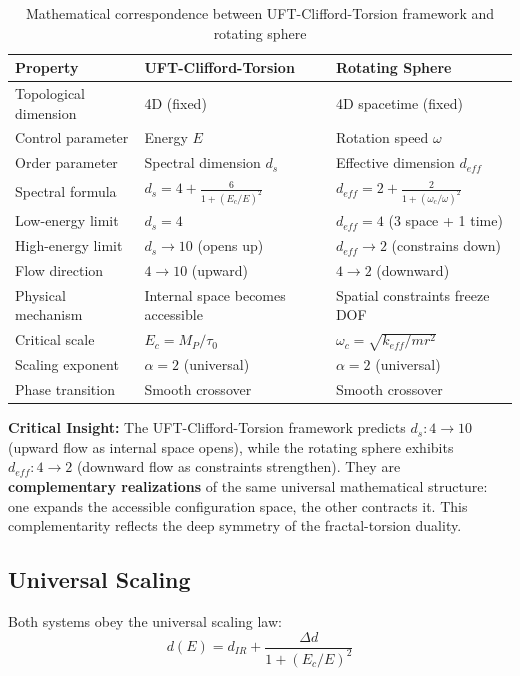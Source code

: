 \documentclass[12pt,a4paper]{article}
\begin{document}
\begin{table}[h]
\centering
\begin{tabular}{p{4cm}p{5cm}p{5cm}}
\toprule
\textbf{Property} & \textbf{UFT-Clifford-Torsion} & \textbf{Rotating Sphere} \\
\midrule
Topological dimension & 4D (fixed) & 4D spacetime (fixed) \\
Control parameter & Energy $E$ & Rotation speed $\omega$ \\
Order parameter & Spectral dimension $d_s$ & Effective dimension $d_{eff}$ \\
Spectral formula & $d_s = 4 + \frac{6}{1+(E_c/E)^2}$ & $d_{eff} = 2 + \frac{2}{1+(\omega_c/\omega)^2}$ \\
Low-energy limit & $d_s = 4$ & $d_{eff} = 4$ (3 space + 1 time) \\
High-energy limit & $d_s \to 10$ (opens up) & $d_{eff} \to 2$ (constrains down) \\
Flow direction & $4 \to 10$ (upward) & $4 \to 2$ (downward) \\
Physical mechanism & Internal space becomes accessible & Spatial constraints freeze DOF \\
Critical scale & $E_c = M_P/\tau_0$ & $\omega_c = \sqrt{k_{eff}/mr^2}$ \\
Scaling exponent & $\alpha = 2$ (universal) & $\alpha = 2$ (universal) \\
Phase transition & Smooth crossover & Smooth crossover \\
\bottomrule
\end{tabular}
\caption{Mathematical correspondence between UFT-Clifford-Torsion framework and rotating sphere}
\label{tab:correspondence}
\end{table}

\textbf{Critical Insight:} The UFT-Clifford-Torsion framework predicts $d_s: 4 \to 10$ (upward flow as internal space opens), while the rotating sphere exhibits $d_{eff}: 4 \to 2$ (downward flow as constraints strengthen). They are \textbf{complementary realizations} of the same universal mathematical structure: one expands the accessible configuration space, the other contracts it. This complementarity reflects the deep symmetry of the fractal-torsion duality.

\subsection{Universal Scaling}

Both systems obey the universal scaling law:
\begin{equation}
    d(E) = d_{IR} + \frac{\Delta d}{1+(E_c/E)^2}
\end{equation}
\end{document}
